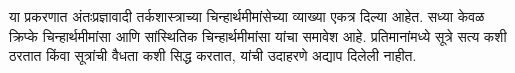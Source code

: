\documentclass[../../../include/open-logic-chapter]{subfiles}
\begin{document}

\begin{editorial}
  या प्रकरणात अंतःप्रज्ञावादी तर्कशास्त्राच्या
  चिन्हार्थमीमांसेच्या व्याख्या एकत्र दिल्या
  आहेत. सध्या केवळ क्रिप्के चिन्हार्थमीमांसा आणि
  सांस्थितिक चिन्हार्थमीमांसा यांचा समावेश आहे.
  प्रतिमानांमध्ये सूत्रे सत्य कशी ठरतात किंवा
  सूत्रांची वैधता कशी सिद्ध करतात, यांची उदाहरणे
  अद्याप दिलेली नाहीत.
\end{editorial}


\OLEndChapterHook
\end{document}
